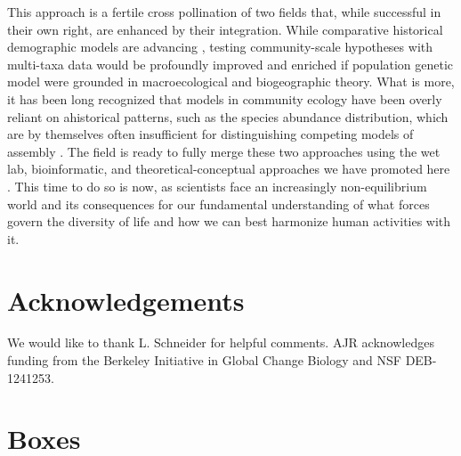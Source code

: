 \documentclass[12pt]{article}
\newcounter{Box}
\begin{document}
This approach is a fertile cross pollination of two fields that, while
successful in their own right, are enhanced by their
integration. While comparative historical demographic models are
advancing \citep{Xue2015-el, Hickerson2006-uf, Carstens2016-mc,
  Chan2014-nq, Satler2016-lb}, testing community-scale hypotheses with
multi-taxa data would be profoundly improved and enriched if
population genetic model were grounded in macroecological and
biogeographic theory.  What is more, it has been long recognized that
models in community ecology have been overly reliant on ahistorical
patterns, such as the species abundance distribution, which are by
themselves often insufficient for distinguishing competing models of
assembly \citep{McGill2007-hx}.  The field is ready to
fully merge these two approaches using the wet lab, bioinformatic, and
theoretical-conceptual approaches we have promoted here . This time to do so is now, 
% 
% 
% 
 as scientists face an increasingly
non-equilibrium world and its consequences for our fundamental
understanding of what forces govern the diversity of life and how we
can best harmonize human activities with it.

\section*{Acknowledgements}

We would like to thank L. Schneider for helpful comments. AJR
acknowledges funding from the Berkeley Initiative in Global Change
Biology and NSF DEB-1241253.

\pagebreak




\pagebreak

\section*{Boxes}


\label{box:wet}
\end{document}
